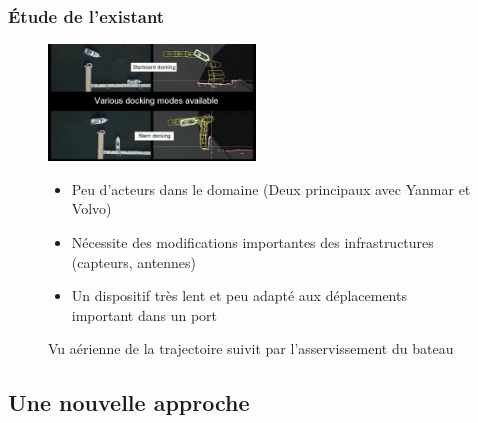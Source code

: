\documentclass[8pt]{beamer}
\begin{document}
\begin{frame}
  \frametitle{Étude de l'existant}

   \begin{figure}
    \begin{minipage}[c]{.46\linewidth}
        \centering
        \includegraphics[width=55mm]{boat_docking.jpg}
        \caption{Vu aérienne de la trajectoire suivit par l'asservissement du bateau \footnotemark}
    \end{minipage}
    \hfill%
    \begin{minipage}[c]{.46\linewidth}
        \centering
        \begin{itemize}
        \item Peu d'acteurs dans le domaine (Deux principaux avec Yanmar et Volvo) \break
          \pause
        \item Nécessite des modifications importantes des infrastructures (capteurs, antennes) \break
          \pause
        \item Un dispositif très lent et peu adapté aux déplacements important dans un port 
        \end{itemize}
    \end{minipage}
     
\end{figure}
\end{frame}

\subsection{Une nouvelle approche}
\end{document}

